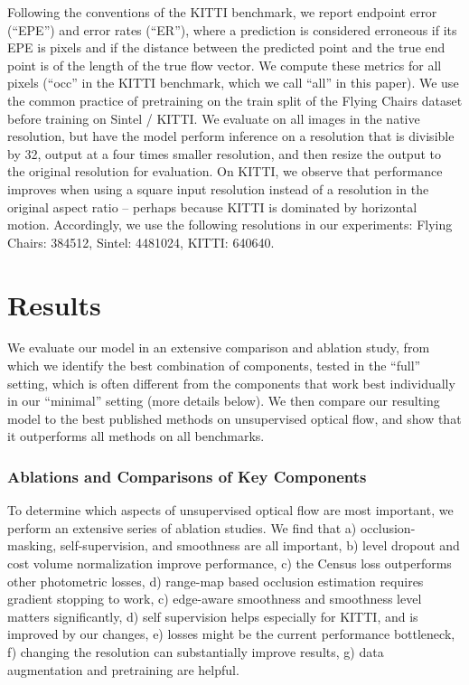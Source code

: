 \documentclass[runningheads]{llncs}
\begin{document}
Following the conventions of the KITTI benchmark, we report endpoint error (``EPE'') and error rates (``ER''), where a prediction is considered erroneous if its EPE is  pixels and if the distance between the predicted point and the true end point is  of the length of the true flow vector. We compute these metrics for all pixels (``occ'' in the KITTI benchmark, which we call ``all'' in this paper).
We use the common practice of pretraining on the train split of the Flying Chairs dataset before training on Sintel / KITTI. We evaluate on all images in the native resolution, but have the model perform inference on a resolution that is divisible by 32, output at a four times smaller resolution, and then resize the output to the original resolution for evaluation. On KITTI, we observe that performance improves when using a square input resolution instead of a resolution in the original aspect ratio -- perhaps because KITTI is dominated by horizontal motion. Accordingly, we use the following resolutions in our experiments: Flying Chairs: 384512, Sintel: 4481024, KITTI: 640640.

\section{Results}

We evaluate our model in an extensive comparison and ablation study, from which we identify the best combination of components, tested in the ``full'' setting, which is often different from the components that work best individually in our ``minimal'' setting (more details below). We then compare our resulting model to the best published methods on unsupervised optical flow, and show that it outperforms all methods on all benchmarks.

\subsubsection{Ablations and Comparisons of Key Components}
To determine which aspects of unsupervised optical flow are most important, we perform an extensive series of ablation studies.
We find that a) occlusion-masking, self-supervision, and smoothness are all important, b) level dropout and cost volume normalization improve performance, c) the Census loss outperforms other photometric losses, d) range-map based occlusion estimation requires gradient stopping to work, c) edge-aware smoothness and smoothness level matters significantly, d) self supervision helps especially for KITTI, and is improved by our changes, e) losses might be the current performance bottleneck, f) changing the resolution can substantially improve results, g) data augmentation and pretraining are helpful.
\end{document}
